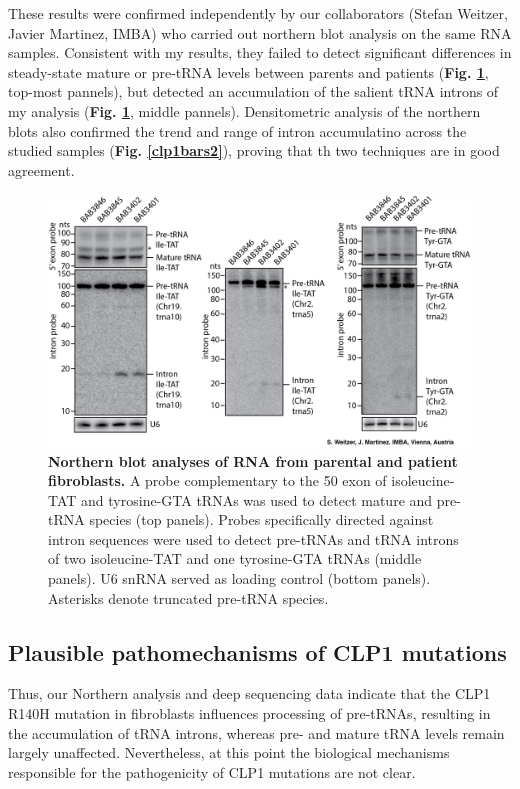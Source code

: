 \documentclass[12pt]{rockefeller}
\begin{document}
These results were confirmed independently by our collaborators (Stefan Weitzer, Javier Martinez, IMBA) who carried out northern blot analysis on the same RNA samples. Consistent with my results, they failed to detect significant differences in steady-state mature or pre-tRNA levels between parents and patients (\textbf{Fig. \ref{nb}}, top-most pannels), but detected an accumulation of the salient tRNA introns of my analysis (\textbf{Fig. \ref{nb}}, middle pannels). Densitometric analysis of the northern blots also confirmed the trend and range of intron accumulatino across the studied samples (\textbf{Fig. \ref{clp1bars2}}), proving that th two techniques are in good agreement. 

\begin{figure}[!ht]%
\centering
\includegraphics[width=\textwidth]{nb.png}%
\caption[Northern blot analyses of RNA from parental and patient fibroblasts.]
{\textbf{Northern blot analyses of RNA from parental and patient fibroblasts.}
A probe complementary to the 50 exon of isoleucine-TAT and tyrosine-GTA tRNAs was used to detect mature and pre-tRNA species (top panels). Probes specifically directed against intron sequences were used to detect pre-tRNAs and tRNA introns of two isoleucine-TAT and one tyrosine-GTA tRNAs (middle panels). U6 snRNA served as loading control (bottom panels). Asterisks denote truncated pre-tRNA species.}
\centering
\label{nb}%
\end{figure}

\subsection{Plausible pathomechanisms of CLP1 mutations}
	Thus, our Northern analysis and deep sequencing data indicate that the CLP1 R140H mutation in fibroblasts influences processing of pre-tRNAs, resulting in the accumulation of tRNA introns, whereas pre- and mature tRNA levels remain largely unaffected. Nevertheless, at this point the biological mechanisms responsible for the pathogenicity of CLP1 mutations are not clear.
\end{document}
